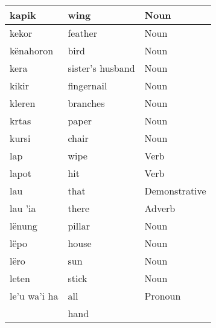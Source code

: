\documentclass{article}
\begin{document}
\begin{longtable}{|l|l|l|}
kapik                   & wing                & {\color[HTML]{009901} Noun}                        \\ \hline
kekor                   & feather             & {\color[HTML]{009901} Noun}                        \\ \hline
kënahoron               & bird                & {\color[HTML]{009901} Noun}                        \\ \hline
kera                    & sister's husband    & {\color[HTML]{009901} Noun}                        \\ \hline
kikir                   & fingernail          & {\color[HTML]{009901} Noun}                        \\ \hline
kleren                  & branches            & {\color[HTML]{009901} Noun}                        \\ \hline
krtas                   & paper               & {\color[HTML]{009901} Noun}                        \\ \hline
kursi                   & chair               & {\color[HTML]{009901} Noun}                        \\ \hline
lap                     & wipe                & {\color[HTML]{009901} Verb}                        \\ \hline
lapot                   & hit                 & {\color[HTML]{009901} Verb}                        \\ \hline
lau                     & that                & {\color[HTML]{009901} Demonstrative}               \\ \hline
lau 'ia                 & there               & {\color[HTML]{009901} Adverb}                      \\ \hline
lënung                  & pillar              & {\color[HTML]{009901} Noun}                        \\ \hline
lëpo                    & house               & {\color[HTML]{009901} Noun}                        \\ \hline
lëro                    & sun                 & {\color[HTML]{009901} Noun}                        \\ \hline
leten                   & stick               & {\color[HTML]{009901} Noun}                        \\ \hline
le'u wa'i ha            & all                 & {\color[HTML]{009901} Pronoun}                     \\ \hline
                        & hand                & {\color[HTML]{009901} }                            \\ \cline{2-2}

\end{longtable}
\end{document}
